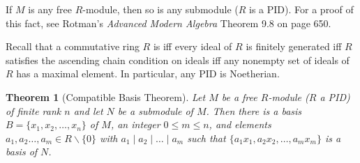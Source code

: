 \documentclass[11pt]{book}
\newcounter{counter}
\newtheorem{theorem}[counter]{Theorem}   \newtheorem*{theorem*}{Theorem}   \newtheorem{lemma}[counter]{Lemma}   \newtheorem{corollary}[counter]{Corollary}
\theoremstyle{definition}   \newtheorem{defn}[counter]{Definition} %
\newcommand{\bs}{\backslash}   \newcommand{\A}{\mathcal{A}}   \newcommand{\sy}{\textnormal{Syl}}   \newcommand{\size}[1]{\left| #1 \right|}
\newcommand{\vs}{\vspace{8pt}}
\numberwithin{counter}{chapter}
\begin{document}
\vs

\begin{remark}
If $M$ is any free $R$-module, then so is any submodule ($R$ is a PID). For a proof of this fact, see Rotman's \emph{Advanced Modern Algebra} Theorem 9.8 on page 650.
\end{remark}

\vs

Recall that a commutative ring $R$ is  iff every ideal of $R$ is finitely generated iff $R$ satisfies the ascending chain condition on ideals iff any nonempty set of ideals of $R$ has a maximal element. In particular, any PID is Noetherian.

\vs

\begin{theorem}[Compatible Basis Theorem]
Let $M$ be a free $R$-module ($R$ a PID) of finite rank $n$ and let $N$ be a submodule of $M$. Then there is a basis $B = \{x_1,x_2,\dots,x_n\}$ of $M$, an integer $0 \leq m \leq n$, and elements $a_1,a_2\dots,a_m \in R \bs \{0\}$ with $a_1 \mid a_2 \mid \dots \mid a_m$ such that $\{a_1x_1,a_2x_2,\dots,a_mx_m\}$ is a basis of $N$.
\end{theorem}
\end{document}
